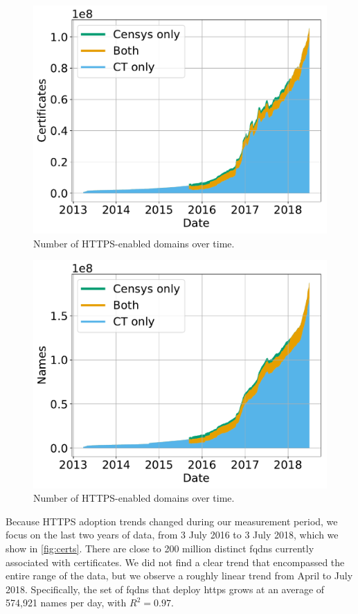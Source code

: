\begin{figure}
  \centering
  \includegraphics[width=\linewidth]{fig/cert_count_valid}
  \caption{Number of HTTPS-enabled domains over time.}
\label{fig:certs}
\end{figure}

\begin{figure}
  \centering
  \includegraphics[width=\linewidth]{fig/name_count_valid}
  \caption{Number of HTTPS-enabled domains over time.}
  \label{fig:cert-add-exp}
\end{figure}

Because HTTPS adoption trends changed during our measurement period, we focus on
the last two years of data, from 3 July 2016 to 3 July 2018, which we show in
\autoref{fig:certs}. There are close to 200 million distinct \acp{fqdn}
currently associated with  certificates. We did not find a clear
trend that encompassed the entire range of the data, but we observe a roughly
linear trend from April to July 2018. Specifically, the set of \acp{fqdn} that
deploy \ac{https} grows at an average of 574,921 names per day, with $R^2=0.97$.

